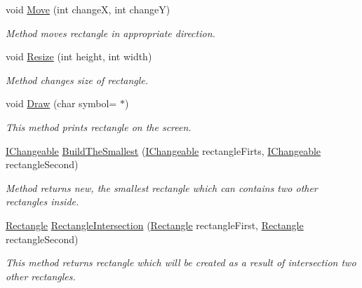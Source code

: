 \begin{DoxyCompactItemize}
void \mbox{\hyperlink{class_home_work_1_1_task_library_1_1_tasks_1_1_lesson6_1_1_task2_1_1_classes_1_1_rectangle_ae585cf633082fb4d72098a72161d49a5}{Move}} (int changeX, int changeY)
\begin{DoxyCompactList}\small\item\em Method moves rectangle in appropriate direction. \end{DoxyCompactList}\item 
void \mbox{\hyperlink{class_home_work_1_1_task_library_1_1_tasks_1_1_lesson6_1_1_task2_1_1_classes_1_1_rectangle_a6f52dae1798b1343f1d95d4e64d4417f}{Resize}} (int height, int width)
\begin{DoxyCompactList}\small\item\em Method changes size of rectangle. \end{DoxyCompactList}\item 
void \mbox{\hyperlink{class_home_work_1_1_task_library_1_1_tasks_1_1_lesson6_1_1_task2_1_1_classes_1_1_rectangle_ac7cf849ea33764185a7c82bb20d57e0c}{Draw}} (char symbol=\textquotesingle{} $\ast$\textquotesingle{})
\begin{DoxyCompactList}\small\item\em This method prints rectangle on the screen. \end{DoxyCompactList}\item 
\mbox{\hyperlink{interface_home_work_1_1_task_library_1_1_tasks_1_1_lesson6_1_1_task2_1_1_interfaces_1_1_i_changeable}{I\+Changeable}} \mbox{\hyperlink{class_home_work_1_1_task_library_1_1_tasks_1_1_lesson6_1_1_task2_1_1_classes_1_1_rectangle_a320867e44519eebbff5887919557b996}{Build\+The\+Smallest}} (\mbox{\hyperlink{interface_home_work_1_1_task_library_1_1_tasks_1_1_lesson6_1_1_task2_1_1_interfaces_1_1_i_changeable}{I\+Changeable}} rectangle\+Firts, \mbox{\hyperlink{interface_home_work_1_1_task_library_1_1_tasks_1_1_lesson6_1_1_task2_1_1_interfaces_1_1_i_changeable}{I\+Changeable}} rectangle\+Second)
\begin{DoxyCompactList}\small\item\em Method returns new, the smallest rectangle which can contains two other rectangles inside. \end{DoxyCompactList}\item 
\mbox{\hyperlink{class_home_work_1_1_task_library_1_1_tasks_1_1_lesson6_1_1_task2_1_1_classes_1_1_rectangle}{Rectangle}} \mbox{\hyperlink{class_home_work_1_1_task_library_1_1_tasks_1_1_lesson6_1_1_task2_1_1_classes_1_1_rectangle_a1055ff34695887cce20d98e2d1838407}{Rectangle\+Intersection}} (\mbox{\hyperlink{class_home_work_1_1_task_library_1_1_tasks_1_1_lesson6_1_1_task2_1_1_classes_1_1_rectangle}{Rectangle}} rectangle\+First, \mbox{\hyperlink{class_home_work_1_1_task_library_1_1_tasks_1_1_lesson6_1_1_task2_1_1_classes_1_1_rectangle}{Rectangle}} rectangle\+Second)
\begin{DoxyCompactList}\small\item\em This method returns rectangle which will be created as a result of intersection two other rectangles. \end{DoxyCompactList}\end{DoxyCompactItemize}
